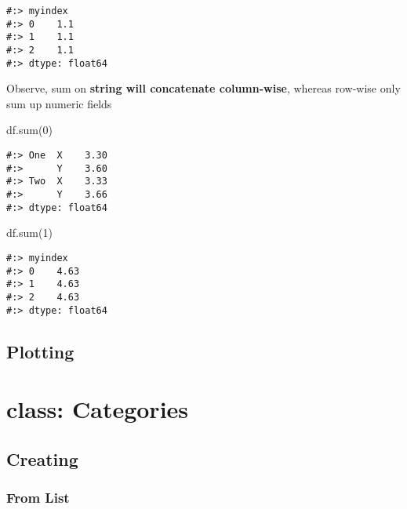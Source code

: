 \documentclass[
]{book}
\newenvironment{Shaded}{\begin{snugshade}}{\end{snugshade}}
\newcommand{\BuiltInTok}[1]{#1}
\newcommand{\DecValTok}[1]{\textcolor[rgb]{0.06,0.06,0.06}{#1}}
\newcommand{\NormalTok}[1]{#1}
\begin{document}
\begin{verbatim}
#:> myindex
#:> 0    1.1
#:> 1    1.1
#:> 2    1.1
#:> dtype: float64
\end{verbatim}

Observe, sum on \textbf{string will concatenate column-wise}, whereas row-wise only sum up numeric fields

\begin{Shaded}
\begin{Highlighting}[]
\NormalTok{df.}\BuiltInTok{sum}\NormalTok{(}\DecValTok{0}\NormalTok{)}
\end{Highlighting}
\end{Shaded}

\begin{verbatim}
#:> One  X    3.30
#:>      Y    3.60
#:> Two  X    3.33
#:>      Y    3.66
#:> dtype: float64
\end{verbatim}

\begin{Shaded}
\begin{Highlighting}[]
\NormalTok{df.}\BuiltInTok{sum}\NormalTok{(}\DecValTok{1}\NormalTok{)}
\end{Highlighting}
\end{Shaded}

\begin{verbatim}
#:> myindex
#:> 0    4.63
#:> 1    4.63
#:> 2    4.63
#:> dtype: float64
\end{verbatim}

\hypertarget{plotting}{%
\subsection{Plotting}\label{plotting}}

\hypertarget{class-categories}{%
\section{class: Categories}\label{class-categories}}

\hypertarget{creating-2}{%
\subsection{Creating}\label{creating-2}}

\hypertarget{from-list}{%
\subsubsection{From List}\label{from-list}}
\end{document}
